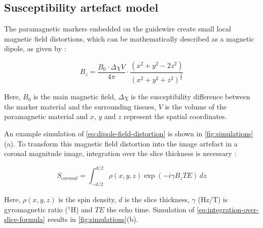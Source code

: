 \documentclass[conference]{IEEEtran}
\begin{document}
\subsection{Susceptibility artefact model}\label{artefact-simulation}

The paramagnetic markers embedded on the guidewire create small local magnetic field distortions, which can be mathematically described as a magnetic dipole, as given by \cite{pmid14523965}:

\begin{equation}
\label{eq:dipole-field-distortion}
B_z = \frac{B_0 \cdot \Delta{\chi} V}{4 \pi} \cdot \frac{(x^2 + y^2 - 2z^2)}{(x^2 + y^2 + z^2)^{\frac{5}{2}}}
\end{equation}

Here, $B_0$ is the main magnetic field, $\Delta{\chi}$ is the susceptibility difference between the marker material and the surrounding tissues, $V$ is the volume of the paramagnetic material and $x$, $y$ and $z$ represent the spatial coordinates.

An example simulation of \eqref{eq:dipole-field-distortion} is shown in \autoref{fig:simulations}(a). To transform this magnetic field distortion into the image artefact in a coronal magnitude image, integration over the slice thickness is necessary \cite{pmid14523965}:

\begin{equation}
\label{eq:integration-over-slice-formula}
S_{coronal} = \int_{-d/2}^{d/2} {\rho}(x,y,z) \exp(-i\gamma B_z TE) \,dz
\end{equation}

Here, $\rho (x,y,z)$ is the spin density, $d$ is the slice thickness, $\gamma$ (Hz/T) is gyromagnetic ratio ($^1\text{H}$) and $TE$ the echo time. Simulation of \eqref{eq:integration-over-slice-formula} results in \autoref{fig:simulations}(b).
\end{document}
